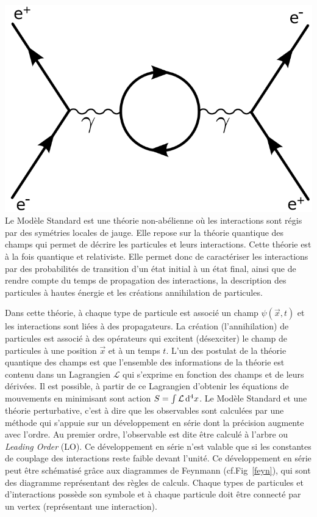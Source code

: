 {	\includegraphics[width=\marginparwidth]{SM/feyn3.png}
	\label{feyn}
}
Le Modèle Standard est une théorie non-abélienne où les interactions sont régis par des symétries locales de jauge. Elle repose sur la théorie quantique des champs qui permet de décrire les particules et leurs interactions. Cette théorie est à la fois quantique et relativiste. Elle permet donc de caractériser les interactions par des probabilités de transition d'un état initial à un état final, ainsi que de rendre compte du temps de propagation des interactions, la description des particules à hautes énergie et les créations annihilation de particules.

Dans cette théorie, à chaque type de particule est associé un champ $\psi(\vec{x},t)$ et les interactions sont liées à des propagateurs. La création (l'annihilation) de particules est associé à des opérateurs qui excitent (désexciter) le champ de particules à une position $\vec{x}$ et à un temps $t$. L'un des postulat de la théorie quantique des champs est que l'ensemble des informations de la théorie est contenu dans un Lagrangien $\mathcal{L}$ qui s'exprime en fonction des champs et de leurs dérivées. Il est possible, à partir de ce Lagrangien d'obtenir les équations de mouvements en minimisant sont action $S=\int\mathcal{L}\mathop{}\!\mathrm{d^4}{x}$.
Le Modèle Standard et une théorie perturbative, c'est à dire que les observables sont calculées par une méthode qui s'appuie sur un développement en série dont la précision augmente avec l'ordre. Au premier ordre, l'observable est dite être calculé à l'arbre ou \textit{Leading Order} (LO). Ce développement en série n'est valable que si les constantes de couplage des interactions reste faible devant l'unité. Ce développement en série peut être schématisé grâce aux diagrammes de Feynmann (cf.Fig~\ref{feyn}), qui sont des diagramme représentant des règles de calculs. Chaque types de particules et d'interactions possède son symbole et à chaque particule doit être connecté par un vertex (représentant une interaction).

